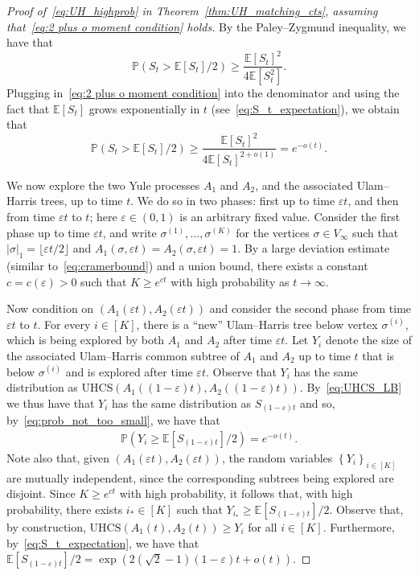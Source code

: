\documentclass[11pt]{article}
\numberwithin{equation}{section}
\newcommand{\p}{\mathbb{P}} %
\newcommand{\E}{\mathbb{E}} %
\newcommand{\eps}{\varepsilon} %
\newcommand{\UHCS}{\mathrm{UHCS}} %
\theoremstyle{definition}
\begin{document}
\begin{proof}[Proof of~\eqref{eq:UH_highprob} in Theorem~\ref{thm:UH_matching_cts}, assuming that~\eqref{eq:2 plus o moment condition} holds] 
By the Paley--Zygmund inequality, we have that 
\begin{equation*}
\p \left( S_{t} > \E[S_{t}] / 2 \right) 
\geq \frac{\E[S_{t}]^{2}}{4 \E\left[S_{t}^{2}\right]}.
\end{equation*}
Plugging in~\eqref{eq:2 plus o moment condition} into the denominator
and using the fact that $\E[S_{t}]$ grows exponentially in $t$ (see~\eqref{eq:S_t_expectation}), 
we obtain that 
\begin{equation}\label{eq:prob_not_too_small}
\p \left( S_{t} > \E[S_{t}] / 2 \right) 
\geq \frac{\E[S_{t}]^{2}}{4\E[S_{t}]^{2+o(1)}}
= e^{-o(t)}.
\end{equation}

We now explore the two Yule processes $A_{1}$ and $A_{2}$, and the associated Ulam--Harris trees, up to time $t$. 
We do so in two phases: 
first up to time $\eps t$, 
and then from time $\eps t$ to $t$; 
here $\eps \in (0,1)$ is an arbitrary fixed value. 
Consider the first phase up to time $\eps t$, and 
write $\sigma^{(1)}, \ldots, \sigma^{(K)}$ for the vertices 
$\sigma \in V_{\infty}$ 
such that $|\sigma|_{1} = \lfloor \eps t / 2 \rfloor$ 
and $A_{1}(\sigma, \eps t) = A_{2}(\sigma, \eps t) = 1$. 
By a large deviation estimate (similar to~\eqref{eq:cramerbound}) and a union bound, 
there exists a constant $c = c(\eps) > 0$ such that 
$K \geq e^{ct}$ with high probability as $t \to \infty$. 

Now condition on $(A_{1}(\eps t), A_{2}(\eps t))$ and consider the second phase from time $\eps t$ to $t$. 
For every $i \in [K]$, there is a ``new'' Ulam--Harris tree below vertex $\sigma^{(i)}$, which is being explored by both $A_{1}$ and $A_{2}$ after time $\eps t$. 
Let $Y_{i}$ denote the size of the associated Ulam--Harris common subtree of $A_{1}$ and $A_{2}$ up to time $t$ that is below $\sigma^{(i)}$ and is explored after time $\eps t$. Observe that $Y_{i}$ has the same distribution as $\UHCS(A_{1}((1-\eps)t), A_{2}((1-\eps)t))$. By~\eqref{eq:UHCS_LB} we thus have that $Y_{i}$ has the same distribution as $S_{(1-\eps)t}$ and so,  by~\eqref{eq:prob_not_too_small}, we have that 
\begin{align*}
    \p \left( Y_{i} \geq \E \left[ S_{(1-\eps)t} \right] / 2 \right) = e^{-o(t)}.
\end{align*} 
Note also that, given  $(A_{1}(\eps t), A_{2}(\eps t))$, the random variables $\left\{ Y_{i} \right\}_{i \in [K]}$ are mutually independent, since the corresponding subtrees being explored are disjoint. 
Since $K \geq e^{ct}$ with high probability, 
it follows that, 
with high probability, 
there exists $i_{*} \in [K]$ such that 
$Y_{i_{*}} \geq \E \left[ S_{(1-\eps)t} \right] / 2$. 
Observe that, by construction, $\UHCS(A_{1}(t), A_{2}(t)) 
\geq Y_{i}$ for all $i\in [K]$. 
Furthermore, by~\eqref{eq:S_t_expectation}, 
we have that 
$\E \left[ S_{(1-\eps)t} \right] / 2 = \exp \left( 2(\sqrt{2}-1) (1-\eps) t + o(t) \right)$. 


\end{proof}
\end{document}
